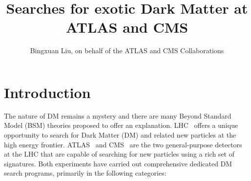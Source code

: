 \documentclass{moriond}
\begin{document}
\vspace*{0cm}
\title{Searches for exotic Dark Matter at ATLAS and CMS}


\author{Bingxuan Liu, on behalf of the ATLAS and CMS Collaborations}

\address{Department of Physics, Simon Fraser University, Vancouver, Canada}

\maketitle{}

\section{Introduction}

The nature of DM remains a mystery and there are many Beyond Standard Model
(BSM) theories proposed to offer an explanation. LHC~\cite{LHCRef} offers a
unique opportunity to search for Dark Matter (DM) and related new particles at
the high energy frontier.  ATLAS~\cite{ATLASRef} and CMS~\cite{CMSRef} are the
two general-purpose detectors at the LHC that are capable of searching for new
particles using a rich set of signatures. Both experiments have carried out
comprehensive dedicated DM search programs, primarily in the following
categories: 
\end{document}
